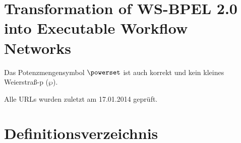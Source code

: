 \documentclass[paper=a5,twoside,fontsize=10pt, DIV=calc, headings=small,bibliography=totoc, listof=totoc]{scrbook}
\begin{document}
%
\chapter{Transformation of WS-BPEL 2.0 into Executable Workflow Networks}
\label{chap:bpel-ewfn-transformation}
\resetchapterfooter

Das Potenzmengensymbol $\powerset$ ist auch korrekt und kein kleines Weierstraß-p ($\wp$).

\printbibliography
Alle URLs wurden zuletzt am 17.01.2014 gepr\"uft.

\clearpage
\listoffigures
\listoftables

\chapter*{Definitionsverzeichnis}

\appendix


%

\end{document}
